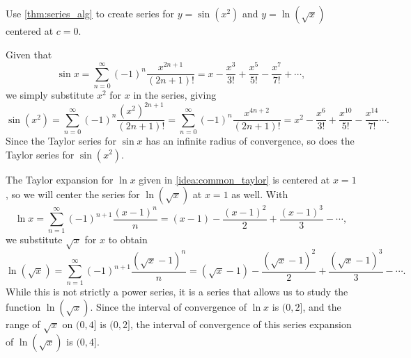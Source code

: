 
{Use \autoref{thm:series_alg} to create series for $y=\sin(x^2)$ and $y=\ln (\sqrt{x})$ centered at $c=0$.}
{Given that 
$$\sin x = \sum_{n=0}^\infty (-1)^n\frac{x^{2n+1}}{(2n+1)!} = x-\frac{x^3}{3!}+\frac{x^5}{5!} -\frac{x^7}{7!}+\dotsb,$$
we simply substitute $x^2$ for $x$ in the series, giving
\[
\sin (x^2) = \sum_{n=0}^\infty (-1)^n\frac{(x^2)^{2n+1}}{(2n+1)!} = \sum_{n=0}^\infty (-1)^n\frac{x^{4n+2}}{(2n+1)!} = x^2-\frac{x^6}{3!}+\frac{x^{10}}{5!} -\frac{x^{14}}{7!}\dotsb.
\]
Since the Taylor series for $\sin x$ has an infinite radius of convergence, so does the Taylor series for $\sin(x^2)$.\bigskip

The Taylor expansion for $\ln x$ given in \autoref{idea:common_taylor} is centered at $x=1$, so we will center the series for $\ln (\sqrt{x})$ at $x=1$ as well.
With 
$$\ln x = \sum_{n=1}^\infty(-1)^{n+1}\frac{(x-1)^n}{n} = (x-1)- \frac{(x-1)^2}{2} +\frac{(x-1)^3}{3}-\dotsb,$$
we substitute $\sqrt{x}$ for $x$ to obtain
$$\ln (\sqrt{x}) = \sum_{n=1}^\infty(-1)^{n+1}\frac{(\sqrt{x}-1)^n}{n} = (\sqrt{x}-1)- \frac{(\sqrt{x}-1)^2}{2} +\frac{(\sqrt{x}-1)^3}{3}-\dotsb.$$
While this is not strictly a power series, it is a series that allows us to study the function $\ln(\sqrt{x})$. Since the interval of convergence of $\ln x$ is $(0,2]$, and the range of $\sqrt{x}$ on $(0,4]$ is $(0,2]$, the interval of convergence of this series expansion of $\ln(\sqrt{x})$ is $(0,4]$.
}

